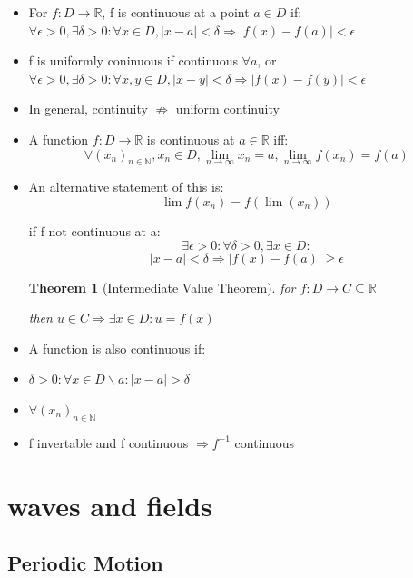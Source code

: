 \documentclass{article}
\newtheorem{theorem}{Theorem}
\begin{document}
\begin{itemize}
    \item For \(f: D\rightarrow\mathbb{R}\), f is continuous at a point \(a\in D\) if:
    \\\(\forall\epsilon>0, \exists\delta>0:\forall x\in D, |x-a|<\delta\Rightarrow|f(x)-f(a)|<\epsilon\)
    \item f is uniformly coninuous if continuous \(\forall a\), or
    \\\(\forall\epsilon>0, \exists\delta>0:\forall x, y\in D, |x-y|<\delta\Rightarrow|f(x)-f(y)|<\epsilon\)
    \item In general, continuity \(\not\Rightarrow\) uniform continuity

    \item A function \(f:D\rightarrow\mathbb{R}\) is continuous at \(a\in\mathbb{R}\) iff:
    \[\forall(x_n)_{n\in\mathbb{N}}, x_n\in D, \lim_{n\to\infty}{x_n} = a, \lim_{n\to\infty}{f(x_n)}=f(a)\]
    \item An alternative statement of this is:
    \[\lim{f(x_n)}=f(\lim(x_n))\]

    if f not continuous at a:
    \[\exists\epsilon>0:\forall\delta>0, \exists x\in D:\]
    \[|x-a|<\delta\Rightarrow|f(x)-f(a)|\ge\epsilon\]
    

\begin{theorem}[Intermediate Value Theorem]

    for \(f:D\rightarrow C\subseteq\mathbb{R}\)

    then \(u\in C\Rightarrow \exists x\in D: u=f(x)\)

\end{theorem} 

    \item A function is also continuous if:
    \item \(\delta >0: \forall x\in D\backslash a: |x-a|>\delta\)
    \item \(\forall (x_n)_{n\in\mathbb{N}}\)

    \item f invertable and f continuous \(\Rightarrow f^{-1}\) continuous
\end{itemize}


\newpage
\section{waves and fields}
\subsection{Periodic Motion}
\end{document}
